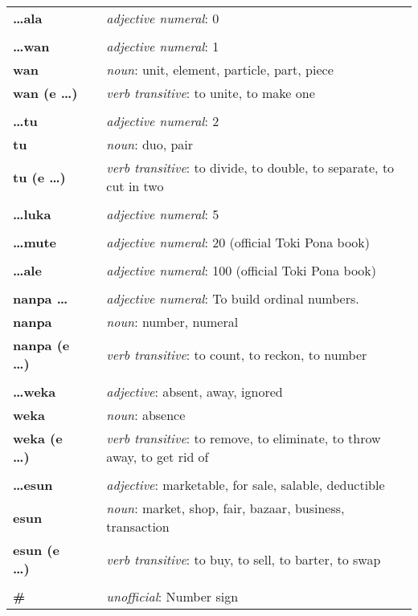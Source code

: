 \begin{supertabular}{p{2,5cm}|ll}
\textbf{\dots ala} && \textit{adjective numeral}: 0 \\ %
 && \\ %
\textbf{\dots wan} && \textit{adjective numeral}: 1 \\ %
\textbf{wan} && \textit{noun}: unit, element, particle, part, piece \\ %
\textbf{wan (e \dots)} && \textit{verb transitive}: to unite, to make one \\ %
 && \\ %
\textbf{\dots tu} && \textit{adjective numeral}: 2 \\ %
\textbf{tu} && \textit{noun}: duo, pair \\ %
\textbf{tu (e \dots)} && \textit{verb transitive}: to divide, to double, to separate, to cut in two \\ %
 && \\ %
\textbf{\dots luka} && \textit{adjective numeral}: 5 \\ %
 && \\ %
\textbf{\dots mute} && \textit{adjective numeral}: 20 (official Toki Pona book) \\ %
 && \\ %
\textbf{\dots ale} && \textit{adjective numeral}: 100 (official Toki Pona book) \\ %
 && \\ %
\textbf{nanpa \dots} && \textit{adjective numeral}: To build ordinal numbers. \\ %
\textbf{nanpa} && \textit{noun}: number, numeral \\ %
\textbf{nanpa (e \dots)} && \textit{verb transitive}: to count, to reckon,  to number \\ %
 && \\ %
\textbf{\dots weka} && \textit{adjective}: absent, away, ignored \\ %
\textbf{weka} && \textit{noun}: absence \\ %
\textbf{weka (e \dots)} && \textit{verb transitive}: to remove, to eliminate, to throw away, to get rid of \\ %
 && \\ %
\textbf{\dots esun} && \textit{adjective}: marketable, for sale, salable, deductible \\  %
\textbf{esun} && \textit{noun}: market, shop, fair, bazaar, business, transaction \\ %
\textbf{esun (e \dots)} && \textit{verb transitive}: to buy, to sell, to barter, to swap \\ %
 && \\ %
\textbf{\#} && \textit{unofficial}: Number sign  \\ %
\end{supertabular} \\
%
\newpage
